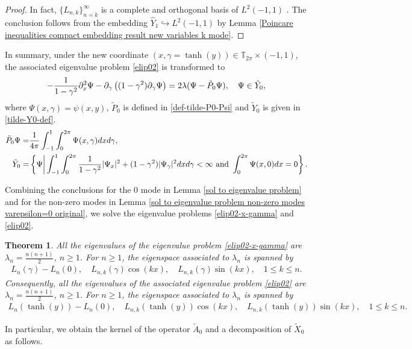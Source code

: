 \documentclass[1 [leqno, 11pt]{amsart}
\numberwithin{equation}{section}
\let\pa=\partial
\newtheorem{Theorem}{Theorem}[section]
\begin{document}
\begin{CJK*}{GBK}{song}
\begin{proof}
In fact,  $\{L_{n,k}\}_{n=k}^\infty$ is a complete and orthogonal basis of $L^2(-1,1)$  \cite{Courant-Hilbert53,Dominguez-Heuer-Sayas11}. The conclusion follows from the embedding $\hat Y_1\hookrightarrow L^2(-1,1)$ by Lemma \ref{Poincare inequalities compact embedding result new variables k mode}.
\end{proof}





In summary, under the new coordinate $(x,\gamma=\tanh(y))\in\mathbb{T}_{2\pi}\times (-1,1)$,  the associated eigenvalue problem \eqref{elip02} is transformed to
\begin{align}\label{elip02-x-gamma}
-{1\over1-\gamma^2}\pa_x^2\Psi-\pa_\gamma\left((1-\gamma^2)\pa_\gamma\Psi\right)=2\lambda(\Psi-\tilde P_0\Psi),\quad \Psi\in\tilde Y_0,
\end{align}
where $\Psi(x, \gamma) = \psi(x, y)$, $\tilde P_0$ is defined in \eqref{def-tilde-P0-Psi} and $\tilde{Y}_0$ is given in \eqref{tilde-Y0-def}.
\begin{align*}
\tilde P_0\Psi =& \frac{1}{4\pi}\int_{-1}^1 \int_{0}^{2\pi} \Psi(x, \gamma) dx d \gamma,\\
\tilde{Y}_0 =& \left\{ \Psi \bigg| \int_{-1}^1\int_{0}^{2\pi}{1\over1-\gamma^2}|\Psi_{x}|^2+(1-\gamma^2)|\Psi_{\gamma}|^2dx d\gamma< \infty \text{ and }\int_0^{2\pi} \Psi(x, 0)dx= 0 \right\}.
\end{align*}
\fi

Combining the conclusions for  the $0$ mode in Lemma \ref{sol to eigenvalue problem} and for the non-zero modes in Lemma \ref{sol to eigenvalue problem non-zero modes varepsilon=0 original}, we solve the eigenvalue problems \eqref{elip02-x-gamma} and \eqref{elip02}.
\begin{Theorem}\label{associate_ep0}
All the eigenvalues of the eigenvalue problem \eqref{elip02-x-gamma} are $ \lambda_n  = \frac{n(n+1)}{2}$, $n\geq1$. For $n\geq1$, the eigenspace associated to $\lambda_n$ is  spanned by
\begin{align*}
 L_{n}(\gamma) - L_n(0), \quad  L_{n,k}(\gamma)\cos(kx), \quad L_{n,k}(\gamma)\sin(kx), \quad  1 \leq k\leq n.
 \end{align*}
Consequently, all the eigenvalues of the associated eigenvalue problem \eqref{elip02} are $\lambda_n  = \frac{n(n+1)}{2}$, $n\geq1$. For $n\geq1$, the eigenspace associated to $\lambda_n$ is  spanned by
\begin{align}\label{sol-elip02}
 L_{n}(\tanh(y)) - L_n(0), \quad  L_{n,k}(\tanh(y))\cos(kx), \quad L_{n,k}(\tanh(y))\sin(kx), \quad  1 \leq k\leq n.
 \end{align}
\end{Theorem}
In particular, we obtain the kernel of  the operator $\tilde A_0$ and a decomposition of $\tilde X_{0}$ as follows.



\end{CJK*}
\end{document}
